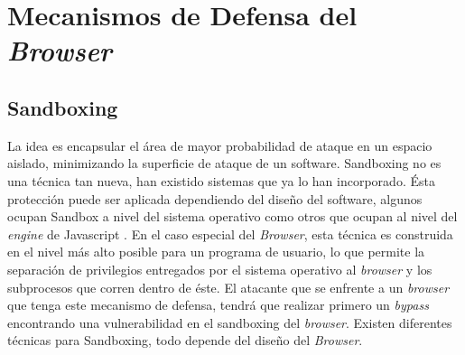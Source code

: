 




\section{Mecanismos de Defensa del \textit{Browser}}

\subsection{Sandboxing}
    \label{chap3:Sandboxing}
    La idea es encapsular el área de mayor probabilidad de ataque en un espacio aislado, minimizando la superficie de ataque de un software. Sandboxing no es una técnica tan nueva, han existido sistemas que ya lo han incorporado. Ésta protección puede ser aplicada dependiendo del diseño del software, algunos ocupan Sandbox a nivel del sistema operativo como otros que ocupan al nivel del \textit{engine} de Javascript \cite{reis2009browser}. En el caso especial del \textit{Browser}, esta técnica es construida en el nivel más alto posible para un programa de usuario, lo que permite la separación de privilegios entregados por el sistema operativo al \textit{browser} y los subprocesos que corren dentro de éste. El atacante que se enfrente a un \textit{browser} que tenga este mecanismo de defensa, tendrá que realizar primero un \textit{bypass} encontrando una vulnerabilidad en el sandboxing del \textit{browser}. Existen diferentes técnicas para Sandboxing, todo depende del diseño del \textit{Browser}.

